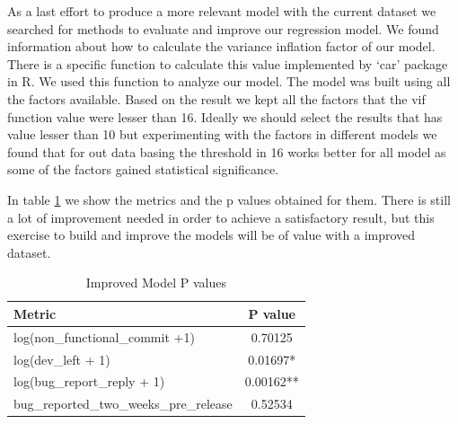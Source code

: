 As a last effort to produce a more relevant model with the current dataset we searched for methods to evaluate and improve our regression model. We found information about how to calculate the variance inflation factor of our model. There is a specific function to calculate this value implemented by `car' package in R. We used this function to analyze our model. The model was built using all the factors available. Based on the result we kept all the factors that the vif function value were lesser than 16. Ideally we should select the results that has value lesser than 10 but experimenting with the factors in different models we found that for out data basing the threshold in 16 works better for all model as some of the factors gained statistical significance.

In table \ref{tab:improved_model_p_values} we show the metrics and the p values obtained for them. There is still a lot of improvement needed in order to achieve a satisfactory result, but this exercise to build and improve the models will be of value with a improved dataset.

\begin{table}[!hbt]
      \begin{center}
            \caption{Improved Model P values}
            \label{tab:improved_model_p_values}
            \begin{tabular}{l| c}
            \toprule
            \textbf{Metric}  & \textbf{P value} \\ \midrule                                         
            log(non\_functional\_commit +1)                  &            0.70125 \\ 
            log(dev\_left + 1)                               &            0.01697* \\ 
            log(bug\_report\_reply + 1)                      &           0.00162** \\ 
            bug\_reported\_two\_weeks\_pre\_release          &                 0.52534 \\ \bottomrule
            \end{tabular}
      \end{center}
\end{table}

\vspace{1mm}
\vspace{1mm}
